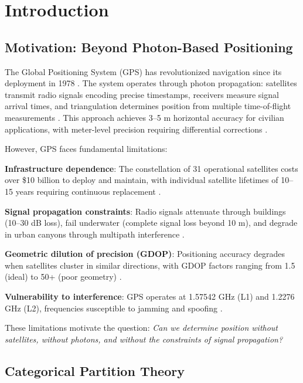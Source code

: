 \documentclass[twocolumn,10pt,a4paper]{article}
\theoremstyle{definition}
\theoremstyle{remark}
\begin{document}
\section{Introduction}
\label{sec:introduction}

\subsection{Motivation: Beyond Photon-Based Positioning}

The Global Positioning System (GPS) has revolutionized navigation since its deployment in 1978 \cite{parkinson1996gps}. The system operates through photon propagation: satellites transmit radio signals encoding precise timestamps, receivers measure signal arrival times, and triangulation determines position from multiple time-of-flight measurements \cite{kaplan2005gps}. This approach achieves 3--5 m horizontal accuracy for civilian applications, with meter-level precision requiring differential corrections \cite{hofmann2012gps}.

However, GPS faces fundamental limitations:

\textbf{Infrastructure dependence}: The constellation of 31 operational satellites costs over \$10 billion to deploy and maintain, with individual satellite lifetimes of 10--15 years requiring continuous replacement \cite{gps2020constellation}.

\textbf{Signal propagation constraints}: Radio signals attenuate through buildings (10--30 dB loss), fail underwater (complete signal loss beyond 10 m), and degrade in urban canyons through multipath interference \cite{groves2013gps}.

\textbf{Geometric dilution of precision (GDOP)}: Positioning accuracy degrades when satellites cluster in similar directions, with GDOP factors ranging from 1.5 (ideal) to 50+ (poor geometry) \cite{langley1999dilution}.

\textbf{Vulnerability to interference}: GPS operates at 1.57542 GHz (L1) and 1.2276 GHz (L2), frequencies susceptible to jamming and spoofing \cite{humphreys2008gps}.

These limitations motivate the question: \textit{Can we determine position without satellites, without photons, and without the constraints of signal propagation?}

\subsection{Categorical Partition Theory}
\end{document}
